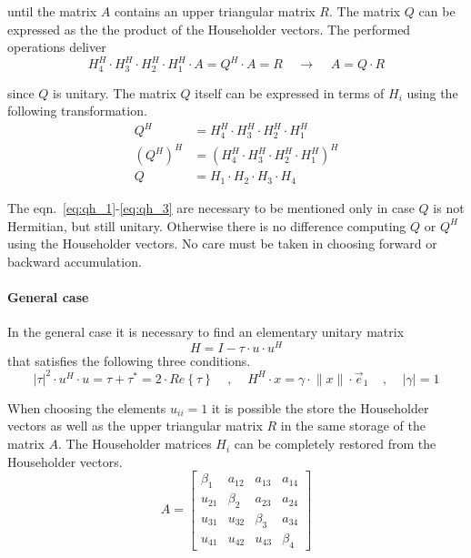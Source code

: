 until the matrix $A$ contains an upper triangular matrix $R$.  The
matrix $Q$ can be expressed as the the product of the Householder
vectors.  The performed operations deliver
\begin{equation}
H^H_4\cdot H^H_3\cdot H^H_2\cdot H^H_1 \cdot A = Q^H\cdot A = R
\;\;\;\; \rightarrow \;\;\;\;
A = Q\cdot R
\end{equation}

since $Q$ is unitary.  The matrix $Q$ itself can be expressed in terms
of $H_i$ using the following transformation.
\begin{align}
\label{eq:qh_1}
Q^H &= H^H_4\cdot H^H_3\cdot H^H_2\cdot H^H_1\\
\left(Q^H\right)^H &= \left(H^H_4\cdot H^H_3\cdot H^H_2\cdot H^H_1\right)^H\\
\label{eq:qh_3}
Q &= H_1\cdot H_2\cdot H_3\cdot H_4
\end{align}

The eqn.~\eqref{eq:qh_1}-\eqref{eq:qh_3} are necessary to be mentioned
only in case $Q$ is not Hermitian, but still unitary.  Otherwise there
is no difference computing $Q$ or $Q^H$ using the Householder vectors.
No care must be taken in choosing forward or backward accumulation.

\paragraph{General case}

In the general case it is necessary to find an elementary unitary
matrix
\begin{equation}
H = I - \tau\cdot u\cdot u^H
\end{equation}
that satisfies the following three conditions.
\begin{equation}
\label{eq:herm_cond}
\left|\tau\right|^2\cdot u^H\cdot u = \tau + \tau^* =
2\cdot Re\left\{\tau \right\}
\;\;\;\; , \;\;\;\;
H^H\cdot x = \gamma\cdot \lVert x \rVert \cdot \vec{e}_1
\;\;\;\; , \;\;\;\;
\lvert \gamma \rvert = 1
\end{equation}

When choosing the elements $u_{ii} = 1$ it is possible the store the
Householder vectors as well as the upper triangular matrix $R$ in the
same storage of the matrix $A$.  The Householder matrices $H_i$ can be
completely restored from the Householder vectors.
\begin{equation}
A =
\begin{bmatrix}
\beta_1 & a_{12} & a_{13} & a_{14}\\
u_{21} & \beta_2 & a_{23} & a_{24}\\
u_{31} & u_{32} & \beta_3 & a_{34}\\
u_{41} & u_{42} & u_{43} & \beta_4
\end{bmatrix}
\end{equation}

